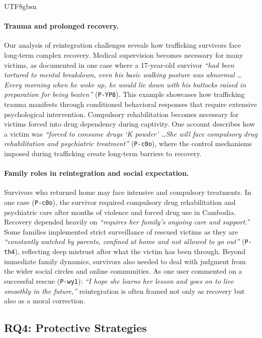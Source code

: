 \documentclass[sigconf,nonacm]{acmart}
\begin{document}
\begin{CJK}{UTF8}{gbsn}
\paragraph{\textbf{Trauma and prolonged recovery.}} Our analysis of reintegration challenges reveals how trafficking survivors face long-term complex recovery. Medical supervision becomes necessary for many victims, as documented in one case where a 17-year-old survivor \textit{``had been tortured to mental breakdown, even his basic walking posture was abnormal \dots Every morning when he woke up, he would lie down with his buttocks raised in preparation for being beaten''} (\texttt{P-YP8}). This example showcases how trafficking trauma manifests through conditioned behavioral responses that require extensive psychological intervention. Compulsory rehabilitation becomes necessary for victims forced into drug dependency during captivity. One account describes how a victim was \textit{``forced to consume drugs `K powder' \dots She will face compulsory drug rehabilitation and psychiatric treatment''} (\texttt{P-c0o}), where the control mechanisms imposed during trafficking create long-term barriers to recovery.

\paragraph{\textbf{Family roles in reintegration and social expectation.}} Survivors who returned home may face intensive and compulsory treatments. In one case (\texttt{P-c0o}), the survivor required compulsory drug rehabilitation and psychiatric care after months of violence and forced drug use in Cambodia. Recovery depended heavily on \textit{``requires her family's ongoing care and support.''} Some families implemented strict surveillance of rescued victims as they are \textit{``constantly watched by parents, confined at home and not allowed to go out''}  (\texttt{P-th4}), reflecting deep mistrust after what the victim has been through. Beyond immediate family dynamics, survivors also needed to deal with judgment from the wider social circles and online communities. As one user commented on a successful rescue (\texttt{P-wy1}): \textit{``I hope she learns her lesson and goes on to live smoothly in the future,''} reintegration is often framed not only as recovery but also as a moral correction.

\subsection{RQ4: Protective Strategies}
\label{sec:RQ4}


\end{CJK}
\end{document}
